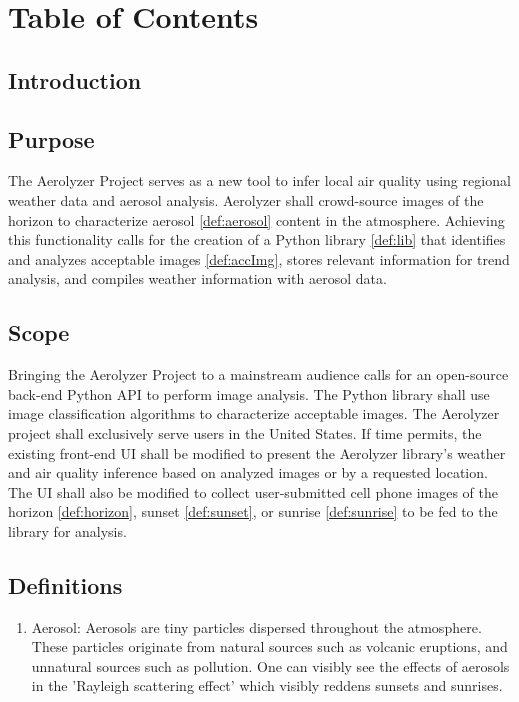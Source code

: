 \documentclass[journal,10pt,draftclsnofoot,onecolumn]{IEEEtran}
\begin{document}
\section{Table of Contents}
\tableofcontents
\clearpage

\begin{singlespace}

\section{Introduction}

	\subsection{Purpose}
		The Aerolyzer Project serves as a new tool to infer local air quality using regional weather data and aerosol analysis.
		Aerolyzer shall crowd-source images of the horizon to characterize aerosol \ref{def:aerosol} content in the atmosphere.
		Achieving this functionality calls for the creation of a Python library \ref{def:lib} that identifies and analyzes acceptable images \ref{def:accImg}, stores relevant information for trend analysis, and compiles weather information with aerosol data. 

	\subsection{Scope}
		Bringing the Aerolyzer Project to a mainstream audience calls for an open-source back-end Python API to perform image analysis.
		The Python library shall use image classification algorithms to characterize acceptable images.
		The Aerolyzer project shall exclusively serve users in the United States.
		If time permits, the existing front-end UI shall be modified to present the Aerolyzer library's weather and air quality inference based on analyzed images or by a requested location.
		The UI shall also be modified to collect user-submitted cell phone images of the horizon \ref{def:horizon}, sunset \ref{def:sunset}, or sunrise \ref{def:sunrise} to be fed to the library for analysis.

	\subsection{Definitions}
		\begin{enumerate}
			\item \label{def:aerosol} Aerosol:
			Aerosols are tiny particles dispersed throughout the atmosphere.
			These particles originate from natural sources such as volcanic eruptions, and unnatural sources such as pollution. 
			One can visibly see the effects of aerosols in the 'Rayleigh scattering effect' \cite{allen_2015} which visibly reddens sunsets and sunrises.


\end{enumerate}
\end{singlespace}
\end{document}
